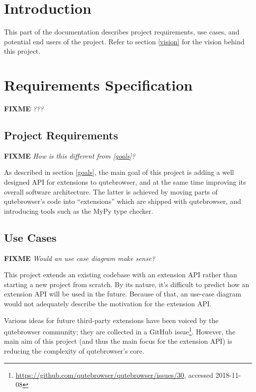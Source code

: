 \documentclass[a4paper,parskip=full]{scrreprt}
\newcommand{\fixme}[1]{\textbf{FIXME} \emph{#1}}
\begin{document}
\chapter{Introduction}
This part of the documentation describes project requirements, use cases, and
potential end users of the project. Refer to section \ref{vision} for the vision
behind this project.


\chapter{Requirements Specification}
\fixme{???}

\section{Project Requirements}
\fixme{How is this different from \ref{goals}?}

As described in section \ref{goals}, the main goal of this project is adding a
well designed API for extensions to qutebrowser, and at the same time improving
its overall software architecture. The latter is achieved by moving parts of
qutebrowser's code into ``extensions'' which are shipped with qutebrowser, and
introducing tools such as the MyPy type checker.

\section{Use Cases}
\fixme{Would an use case diagram make sense?}

This project extends an existing codebase with an extension API rather
than starting a new project from scratch. By its nature, it's difficult to
predict how an extension API will be used in the future. Because of that, an
use-case diagram would not adequately describe the motivation for the extension
API.

Various ideas for future third-party extensions have been voiced by the
qutebrowser community; they are collected in a GitHub
issue\footnote{\url{https://github.com/qutebrowser/qutebrowser/issues/30},
  accessed 2018-11-08}. However, the main aim of this project (and thus the main
focus for the extension API) is reducing the complexity of qutebrowser's core.
\end{document}
